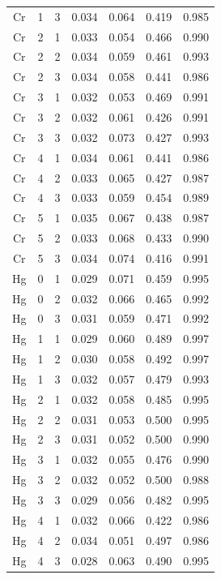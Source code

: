 \documentclass[ms, hidelinks]{uncgdissertationexp3}
\theoremstyle{plain}
\theoremstyle{definition}
\theoremstyle{remark}
\begin{document}
\begin{longtable}{ccccccc}
  Cr & 1 & 3 & 0.034 & 0.064 & 0.419 & 0.985\\
  \rowcolor{gray!6}  Cr & 2 & 1 & 0.033 & 0.054 & 0.466 & 0.990\\
  Cr & 2 & 2 & 0.034 & 0.059 & 0.461 & 0.993\\
  \rowcolor{gray!6}  Cr & 2 & 3 & 0.034 & 0.058 & 0.441 & 0.986\\
  Cr & 3 & 1 & 0.032 & 0.053 & 0.469 & 0.991\\
  \rowcolor{gray!6}  Cr & 3 & 2 & 0.032 & 0.061 & 0.426 & 0.991\\
  Cr & 3 & 3 & 0.032 & 0.073 & 0.427 & 0.993\\
  \rowcolor{gray!6}  Cr & 4 & 1 & 0.034 & 0.061 & 0.441 & 0.986\\
  Cr & 4 & 2 & 0.033 & 0.065 & 0.427 & 0.987\\
  \rowcolor{gray!6}  Cr & 4 & 3 & 0.033 & 0.059 & 0.454 & 0.989\\
  Cr & 5 & 1 & 0.035 & 0.067 & 0.438 & 0.987\\
  \rowcolor{gray!6}  Cr & 5 & 2 & 0.033 & 0.068 & 0.433 & 0.990\\
  Cr & 5 & 3 & 0.034 & 0.074 & 0.416 & 0.991\\
  \rowcolor{gray!6}  Hg & 0 & 1 & 0.029 & 0.071 & 0.459 & 0.995\\
  Hg & 0 & 2 & 0.032 & 0.066 & 0.465 & 0.992\\
  \rowcolor{gray!6}  Hg & 0 & 3 & 0.031 & 0.059 & 0.471 & 0.992\\
  Hg & 1 & 1 & 0.029 & 0.060 & 0.489 & 0.997\\
  \rowcolor{gray!6}  Hg & 1 & 2 & 0.030 & 0.058 & 0.492 & 0.997\\
  Hg & 1 & 3 & 0.032 & 0.057 & 0.479 & 0.993\\
  \rowcolor{gray!6}  Hg & 2 & 1 & 0.032 & 0.058 & 0.485 & 0.995\\
  Hg & 2 & 2 & 0.031 & 0.053 & 0.500 & 0.995\\
  \rowcolor{gray!6}  Hg & 2 & 3 & 0.031 & 0.052 & 0.500 & 0.990\\
  Hg & 3 & 1 & 0.032 & 0.055 & 0.476 & 0.990\\
  \rowcolor{gray!6}  Hg & 3 & 2 & 0.032 & 0.052 & 0.500 & 0.988\\
  Hg & 3 & 3 & 0.029 & 0.056 & 0.482 & 0.995\\
  \rowcolor{gray!6}  Hg & 4 & 1 & 0.032 & 0.066 & 0.422 & 0.986\\
  Hg & 4 & 2 & 0.034 & 0.051 & 0.497 & 0.986\\
  \rowcolor{gray!6}  Hg & 4 & 3 & 0.028 & 0.063 & 0.490 & 0.995\\

\end{longtable}
\end{document}

